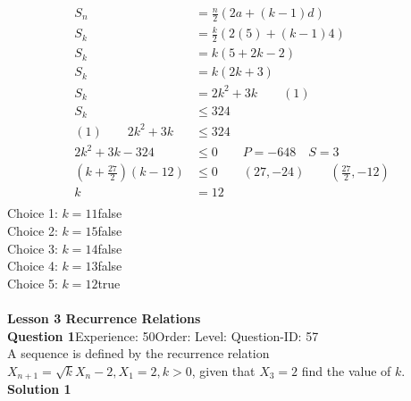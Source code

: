 \documentclass{article}
\begin{document}
\begin{align*}
	S_n&=\displaystyle\frac{n}{2}(2a+(k-1)d)\\[2pt]
	S_k&=\displaystyle\frac{k}{2}(2(5)+(k-1)4)\\[2pt]
	S_k&=k(5+2k-2)\\[2pt]
	S_k&=k(2k+3)\\[2pt]
	S_k&=2k^2+3k \qquad (1)\\[12pt]
	S_k&\leq 324 \\[2pt]
	(1)\qquad 2k^2+3k& \leq 324\\[2pt]
	2k^2+3k-324&\leq 0\qquad P=-648 \quad S=3\\[2pt]
	\left(k+\displaystyle\frac{27}{2}\right)(k-12)&\leq 0 \qquad (27,-24)\qquad \left(\displaystyle\frac{27}{2},-12\right)\\[2pt]
	k&=12\\
\end{align*}
Choice 1: \hspace{20pt}$k=11$\hspace{20pt}false\\
Choice 2: \hspace{20pt}$k=15$\hspace{20pt}false\\
Choice 3: \hspace{20pt}$k=14$\hspace{20pt}false\\
Choice 4: \hspace{20pt}$k=13$\hspace{20pt}false\\
Choice 5: \hspace{20pt}$k=12$\hspace{20pt}true\\
\\[4pt]
\noindent\large{\textbf{Lesson 3 Recurrence Relations}}\\[12pt]
\noindent\textbf{Question 1}\hspace{20pt}Experience: 50\hspace{20pt}Order: \hspace{20pt}Level: \hspace{20pt}Question-ID: 57\\[2pt]
A sequence is defined by the recurrence relation $X_{n+1}=\sqrt{k}X_n-2, X_1=2,k>0$, given that $X_3=2$ find the value of $k$.\\[4pt]
\noindent\textbf{Solution 1}\\[2pt]
\end{document}
